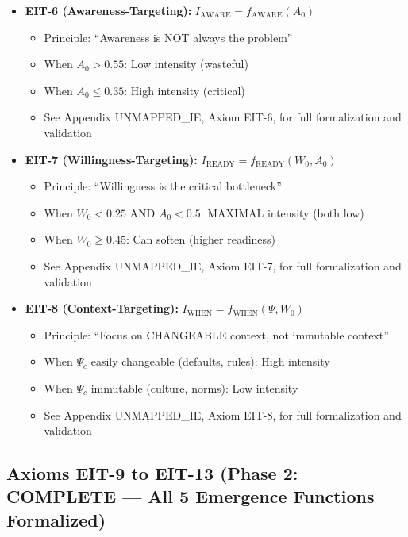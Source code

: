 \begin{itemize}[nosep]
\item \textbf{EIT-6 (Awareness-Targeting):} $I_{\text{AWARE}} = f_{\text{AWARE}}(A_0)$
  \begin{itemize}
  \item Principle: ``Awareness is NOT always the problem''
  \item When $A_0 > 0.55$: Low intensity (wasteful)
  \item When $A_0 \leq 0.35$: High intensity (critical)
  \item See Appendix UNMAPPED_IE, Axiom EIT-6, for full formalization and validation
  \end{itemize}

\item \textbf{EIT-7 (Willingness-Targeting):} $I_{\text{READY}} = f_{\text{READY}}(W_0, A_0)$
  \begin{itemize}
  \item Principle: ``Willingness is the critical bottleneck''
  \item When $W_0 < 0.25$ AND $A_0 < 0.5$: MAXIMAL intensity (both low)
  \item When $W_0 \geq 0.45$: Can soften (higher readiness)
  \item See Appendix UNMAPPED_IE, Axiom EIT-7, for full formalization and validation
  \end{itemize}

\item \textbf{EIT-8 (Context-Targeting):} $I_{\text{WHEN}} = f_{\text{WHEN}}(\Psi, W_0)$
  \begin{itemize}
  \item Principle: ``Focus on CHANGEABLE context, not immutable context''
  \item When $\Psi_c$ easily changeable (defaults, rules): High intensity
  \item When $\Psi_c$ immutable (culture, norms): Low intensity
  \item See Appendix UNMAPPED_IE, Axiom EIT-8, for full formalization and validation
  \end{itemize}
\end{itemize}

\subsection{Axioms EIT-9 to EIT-13 (Phase 2: COMPLETE — All 5 Emergence Functions Formalized)}

